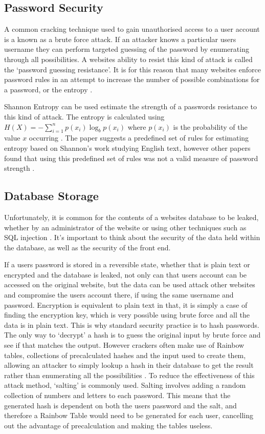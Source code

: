 \subsection{Password Security}

A common cracking technique used to gain unauthorised access to a user account is a known as a brute force attack. If an attacker knows a particular users username they can perform targeted guessing of the password by enumerating through all possibilities. A websites ability to resist this kind of attack is called the `password guessing resistance'. It is for this reason that many websites enforce password rules in an attempt to increase the number of possible combinations for a password, or the entropy \cite{helkala2008authentication}.

Shannon Entropy can be used estimate the strength of a passwords resistance to this kind of attack. The entropy is calculated using $H(X)= -\sum_{i=1}^n{p(x_i)\log_b p(x_i)}$ where $p(x_i)$ is the probability of the value $x$ occurring \cite{burr2013electronic}.
%
The paper suggests a predefined set of rules for estimating entropy based on Shannon's work studying English text, however other papers found that using this predefined set of rules was not a valid measure of password strength \cite{weir2010shannon}.

\subsection{Database Storage} \label{subsection:databasestorage}
Unfortunately, it is common for the contents of a websites database to be leaked, whether by an administrator of the website or using other techniques such as SQL injection \parencite{bbc2012linkedinpasswords,chechik2013passwords}. It's important to think about the security of the data held within the database, as well as the security of the front end.

If a users password is stored in a reversible state, whether that is plain text or encrypted and the database is leaked, not only can that users account can be accessed on the original website, but the data can be used attack other websites and compromise the users account there, if using the same username and password.
%
Encryption is equivalent to plain text in that, it is simply a case of finding the encryption key, which is very possible using brute force and all the data is in plain text. 
%
This is why standard security practice is to hash passwords. The only way to `decrypt' a hash is to guess the original input by brute force and see if that matches the output.
%
However crackers often make use of Rainbow tables, collections of precalculated hashes and the input used to create them, allowing an attacker to simply lookup a hash in their database to get the result rather than enumerating all the possibilities \parencite{jorgensen2012}.
%
To reduce the effectiveness of this attack method, `salting' is commonly used. Salting involves adding a random collection of numbers and letters to each password. This means that the generated hash is dependent on both the users password and the salt, and therefore a Rainbow Table would need to be generated for each user, cancelling out the advantage of precalculation and making the tables useless.

